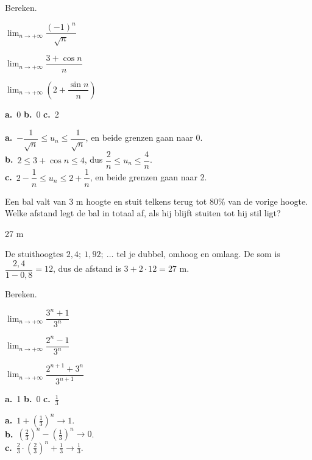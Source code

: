 \begin{oefeningen}
\begin{oefening}[2]\label{oef:h4-insluit}
Bereken.
\begin{reeks}
  \item $\displaystyle\lim_{n\to+\infty} \dfrac{(-1)^n}{\sqrt{n}}$
  \item $\displaystyle\lim_{n\to+\infty} \dfrac{3 + \cos n}{n}$
  \item $\displaystyle\lim_{n\to+\infty} \left(2 + \dfrac{\sin n}{n}\right)$
\end{reeks}
\begin{solution}
\textbf{a.}~0 \quad \textbf{b.}~0 \quad \textbf{c.}~2
\end{solution}
\begin{fullsolution}
\textbf{a.}~$-\dfrac{1}{\sqrt n}\leqslant u_n\leqslant\dfrac{1}{\sqrt n}$, en beide grenzen gaan naar 0.\\
\textbf{b.}~$2\leqslant 3+\cos n\leqslant 4$, dus $\dfrac2n\leqslant u_n\leqslant\dfrac4n$.\\
\textbf{c.}~$2-\dfrac1n\leqslant u_n\leqslant 2+\dfrac1n$, en beide grenzen gaan naar 2.
\end{fullsolution}
\end{oefening}

\begin{oefening}[2]
Een bal valt van 3 m hoogte en stuit telkens terug tot 80\% van de vorige hoogte. Welke afstand legt de bal in totaal af, als hij blijft stuiten tot hij stil ligt?
\begin{solution}
27 m
\end{solution}
\begin{fullsolution}
De stuithoogtes $2{,}4;\ 1{,}92;\ \ldots$ tel je dubbel, omhoog en omlaag. De som is $\dfrac{2{,}4}{1-0{,}8}=12$, dus de afstand is $3+2\cdot 12=27$ m.
\end{fullsolution}
\end{oefening}

\begin{oefening}[2]
Bereken.
\begin{reeks}
  \item $\displaystyle\lim_{n\to+\infty} \dfrac{3^n + 1}{3^n}$
  \item $\displaystyle\lim_{n\to+\infty} \dfrac{2^n - 1}{3^n}$
  \item $\displaystyle\lim_{n\to+\infty} \dfrac{2^{n+1} + 3^n}{3^{n+1}}$
\end{reeks}
\begin{solution}
\textbf{a.}~1 \quad \textbf{b.}~0 \quad \textbf{c.}~$\tfrac13$
\end{solution}
\begin{fullsolution}
\textbf{a.}~$1+(\tfrac13)^n\to 1$.\\
\textbf{b.}~$(\tfrac23)^n-(\tfrac13)^n\to 0$.\\
\textbf{c.}~$\tfrac23\cdot(\tfrac23)^n+\tfrac13\to\tfrac13$.
\end{fullsolution}
\end{oefening}


\end{oefeningen}
